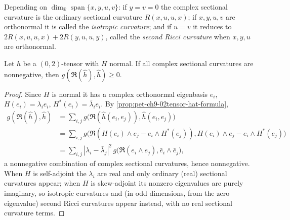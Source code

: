 \begin{remark}
  \label{rem:pet-ch9-complex-sectional-curvature-special-cases}
  Depending on $\dim_{\mathbb{R}}\operatorname{span}\{x,y,u,v\}$: if $y=v=0$ the complex
  sectional curvature is the ordinary sectional curvature $R(x,u,u,x)$; if
  $x,y,u,v$ are orthonormal it is called the \emph{isotropic curvature}; and if
  $u=v$ it reduces to $2R(x,u,u,x)+2R(y,u,u,y)$, called the \emph{second Ricci
  curvature} when $x,y,u$ are orthonormal.
\end{remark}

\begin{proposition}[Proposition 9.4.12]
  \label{prop:pet-ch9-normal-tensor-nonneg-complex-sectional}
  Let $h$ be a $(0,2)$-tensor with $H$ normal. If all complex sectional
  curvatures are nonnegative, then $g(\mathfrak{R}(\hat h),\hat h)\ge0$.
\end{proposition}
\begin{proof}
  Since $H$ is normal it has a complex orthonormal eigenbasis $e_i$,
  $H(e_i)=\lambda_ie_i$, $H^*(e_i)=\bar\lambda_ie_i$. By
  \cref{prop:pet-ch9-02tensor-hat-formula},
  \begin{align*}
    g(\mathfrak{R}(\hat h),\hat h)
    &=\sum_{i,j}g\big(\mathfrak{R}(\hat h(e_i,e_j)),\hat h(e_i,e_j)\big)\\
    &=\sum_{i,j}g\big(\mathfrak{R}(H(e_i)\wedge e_j-e_i\wedge H^*(e_j)),
       H(e_i)\wedge e_j-e_i\wedge H^*(e_j)\big)\\
    &=\sum_{i,j}|\lambda_i-\bar\lambda_j|^2\,g\big(\mathfrak{R}(e_i\wedge e_j),\bar e_i\wedge\bar e_j\big),
  \end{align*}
  a nonnegative combination of complex sectional curvatures, hence
  nonnegative. When $H$ is self-adjoint the $\lambda_i$ are real and only
  ordinary (real) sectional curvatures appear; when $H$ is skew-adjoint its
  nonzero eigenvalues are purely imaginary, so isotropic curvatures and (in
  odd dimensions, from the zero eigenvalue) second Ricci curvatures appear
  instead, with no real sectional curvature terms.
\end{proof}

